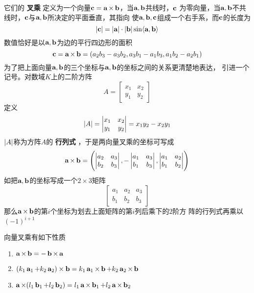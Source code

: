 \documentclass[11pt]{article}
\begin{document}
它们的 \textbf{叉乘} 定义为一个向量\(\bc=\ba\times\bb\)，当\(\ba,\bb\)共线时，\(\bc\)
为零向量，当\(\ba,\bb\)不共线时，\(\bc\)与\(\ba,\bb\)所决定的平面垂直，其指向
使\(\ba,\bb,\bc\)组成一个右手系，而\(\bc\)的长度为
\begin{equation*}
\abs{\bc}=\abs{\ba}\cdot\abs{\bb}\sin\la\ba,\bb\ra
\end{equation*}
数值恰好是以\(\ba,\bb\)为边的平行四边形的面积
\begin{equation*}
\bc=\ba\times\bb=(a_2b_3-a_3b_2,a_3b_1-a_1b_3,a_1b_2-a_2b_1)
\end{equation*}
为了把上面向量\(\ba,\bb\)的三个坐标与\(\ba,\bb\)的坐标之间的关系更清楚地表达，
引进一个记号。对数域\(K\)上的二阶方阵
\begin{equation*}
A=
\begin{bmatrix}
x_1&x_2\\y_1&y_2
\end{bmatrix}
\end{equation*}
定义
\begin{equation*}
\abs{A}=
\begin{vmatrix}
x_1&x_2\\y_1&y_2
\end{vmatrix}=x_1y_2-x_2y_1
\end{equation*}
\(\abs{A}\)称为方阵\(A\)的 \textbf{行列式} ，于是两向量叉乘的坐标可写成
\begin{equation*}
\ba\times\bb=\left(
\begin{vmatrix}
a_2&a_3\\b_2&b_3
\end{vmatrix},-
\begin{vmatrix}
a_1&a_3\\b_1&b_3\\
\end{vmatrix},
\begin{vmatrix}
a_1&a_2\\b_1&b_2
\end{vmatrix}
\right)
\end{equation*}
如把\(\ba,\bb\)的坐标写成一个\(2\times 3\)矩阵
\begin{equation*}
\begin{bmatrix}
a_1&a_2&a_3\\b_1&b_2&b_3
\end{bmatrix}
\end{equation*}
那么\(\ba\times\bb\)的第\(i\)个坐标为划去上面矩阵的第\(i\)列后乘下的\(2\)阶方
阵的行列式再乘以\((-1)^{i+1}\)

向量叉乘有如下性质
\begin{enumerate}
\item \(\ba\times\bb=-\bb\times\ba\)
\item \((k_1\ba_1+k_2\ba_2)\times\bb=k_1\ba_1\times\bb+k_2\ba_2\times\bb\)
\item \(\ba\times(l_1\bb_1+l_2\bb_2)=l_1\ba\times\bb_1+l_2\ba\times\bb_2\)
\end{enumerate}
\end{document}
